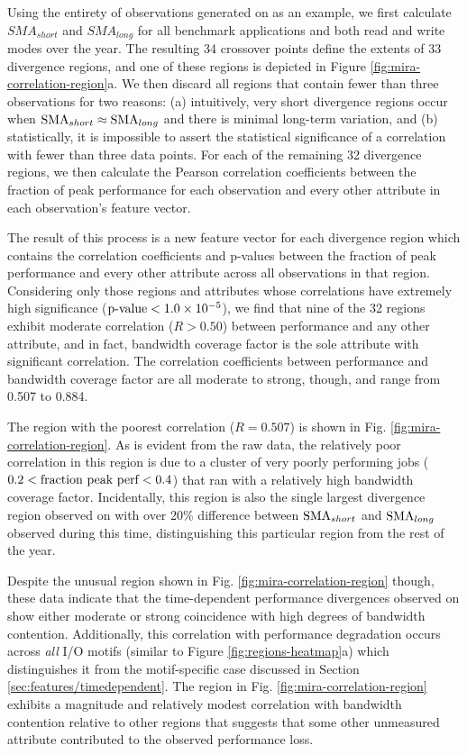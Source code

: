 Using the entirety of observations generated on \mira \mirafsone as an example, we first calculate ${SMA}_{short}$ and ${SMA}_{long}$ for all benchmark applications and both read and write modes over the year.  
The resulting 34 crossover points define the extents of 33 divergence regions, and one of these regions is depicted in Figure \ref{fig:mira-correlation-region}a.
We then discard all regions that contain fewer than three observations for two reasons:
(a) intuitively, very short divergence regions occur when $\textup{SMA}_{short} \approx \textup{SMA}_{long}$ and there is minimal long-term variation, and
(b) statistically, it is impossible to assert the statistical significance of a correlation with fewer than three data points.
For each of the remaining 32 divergence regions, we then calculate the Pearson correlation coefficients between the fraction of peak performance for each observation and every other attribute in each observation's feature vector.

The result of this process is a new feature vector for each divergence region which contains the correlation coefficients and p-values between the fraction of peak performance and every other attribute across all observations in that region.
Considering only those regions and attributes whose correlations have extremely high significance ($\textup{p-value} < {1.0 \times 10^{-5}}$), we find that nine of the 32 regions exhibit moderate correlation ($R > 0.50$) between performance and any other attribute, and in fact, bandwidth coverage factor is the sole attribute with significant correlation.
The correlation coefficients between performance and bandwidth coverage factor are all moderate to strong, though, and range from 0.507 to 0.884.

The region with the poorest correlation ($R = 0.507$) is shown in Fig. \ref{fig:mira-correlation-region}.
As is evident from the raw data, the relatively poor correlation in this region is due to a cluster of very poorly performing jobs (${0.2 < \textup{fraction peak perf} < 0.4}$) that ran with a relatively high bandwidth coverage factor.
Incidentally, this region is also the single largest divergence region observed on \mira with over 20\% difference between $\textup{SMA}_{short}$ and $\textup{SMA}_{long}$ observed during this time, distinguishing this particular region from the rest of the year.

Despite the unusual region shown in Fig. \ref{fig:mira-correlation-region} though, these data indicate that the time-dependent performance divergences observed on \mira show either moderate or strong coincidence with high degrees of bandwidth contention.
Additionally, this correlation with performance degradation occurs across \emph{all} I/O motifs (similar to Figure \ref{fig:regions-heatmap}a) which distinguishes it from the motif-specific case discussed in Section \ref{sec:features/timedependent}.
The region in Fig. \ref{fig:mira-correlation-region} exhibits a magnitude and relatively modest correlation with bandwidth contention relative to other regions that suggests that some other unmeasured attribute contributed to the observed performance loss.





